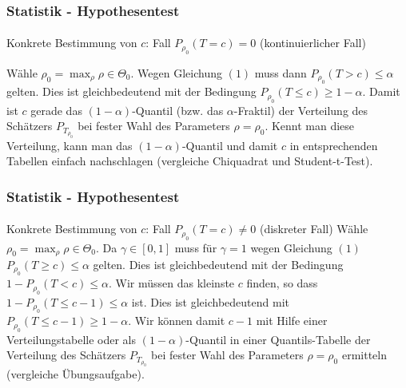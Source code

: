 \documentclass{beamer}
\begin{document}
\begin{frame}
    \frametitle{Statistik - Hypothesentest}
\framesubtitle{}

\begin{block}{Konkrete Bestimmung von $c$: Fall  $P_{\rho_0}(T  = c) = 0$ (kontinuierlicher Fall)}

Wähle $\rho_0 = \max_{\rho} \rho \in \Theta_0$. Wegen  Gleichung $(1)$   muss dann $P_{\rho_0}(T  > c) \leq \alpha$ gelten.  Dies ist gleichbedeutend mit der Bedingung $P_{\rho_0}(T  \leq c)  \geq 1 - \alpha$. Damit ist $c$ gerade das $(1-\alpha)$-Quantil (bzw. das $\alpha$-Fraktil) der Verteilung des Schätzers $P_{T_{\rho_0}}$ bei fester Wahl des Parameters $\rho = \rho_0$. Kennt man diese Verteilung, kann man das  $(1-\alpha)$-Quantil und damit $c$ in entsprechenden Tabellen einfach nachschlagen (vergleiche Chiquadrat und Student-t-Test).  
\end{block}


 \end{frame}
\begin{frame}
    \frametitle{Statistik - Hypothesentest}
\framesubtitle{}

\begin{block}{Konkrete Bestimmung von $c$: Fall  $P_{\rho_0}(T  = c) \neq 0$ (diskreter Fall)}
Wähle $\rho_0 = \max_{\rho} \rho \in \Theta_0$. Da $\gamma \in [0,1]$ muss  für $\gamma =1$ wegen Gleichung $(1)$  $P_{\rho_0}(T  \geq c)  \leq \alpha$ gelten.  Dies ist gleichbedeutend mit der Bedingung $1 - P_{\rho_0}(T  < c)  \leq \alpha$. Wir müssen das kleinste $c$ finden, so dass $1 - P_{\rho_0}(T  \leq c -1)  \leq \alpha$ ist.  Dies ist gleichbedeutend mit  $P_{\rho_0}(T  \leq c -1)  \geq 1- \alpha$. Wir können damit $c-1$ mit Hilfe einer Verteilungstabelle oder als $(1-\alpha)$-Quantil in einer Quantils-Tabelle  der Verteilung des Schätzers $P_{T_{\rho_0}}$ bei fester Wahl des Parameters $\rho = \rho_0$ ermitteln (vergleiche Übungsaufgabe).

\end{block}


 \end{frame}
\end{document}
